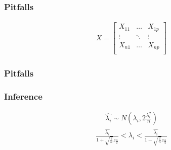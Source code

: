\documentclass[aspectratio=169,10pt,t]{beamer}
\begin{document}
\begin{frame}[t]
	\frametitle{Pitfalls}

	\begin{align*}
		X = \begin{bmatrix}
			X_{11} & \hdots & X_{1p} \\
			\vdots &  \ddots & \vdots  \\
			X_{n1} & \hdots & X_{np} \\
		\end{bmatrix}
	\end{align*}


\end{frame}

\begin{frame}[t]
	\frametitle{Pitfalls}
	\vspace{-2.5cm}
	\begin{figure}[h]
		\subfloat{
			\makebox[0.5\textwidth]{
				\centering
				
			}
		}
		\subfloat{
			\makebox[0.5\textwidth]{
				\centering
				
			}
		}
	\end{figure}

\end{frame}

\begin{frame}[t]
	\frametitle{Inference}

	\begin{align*}
		\hat{\lambda_i} \sim N\left(\lambda_i,2\frac{\lambda_i^2}{n}\right) 
	\end{align*}
	\begin{align*}
		\frac{ \hat{\lambda_i}  }{1+ \sqrt{ \frac{2}{n} } z_{\frac{\alpha }{2}}} < \lambda_i < \frac{ \hat{\lambda_i}  }{1- \sqrt{ \frac{2}{n} } z_{\frac{\alpha }{2}}}
	\end{align*}
\end{frame}
\end{document}
